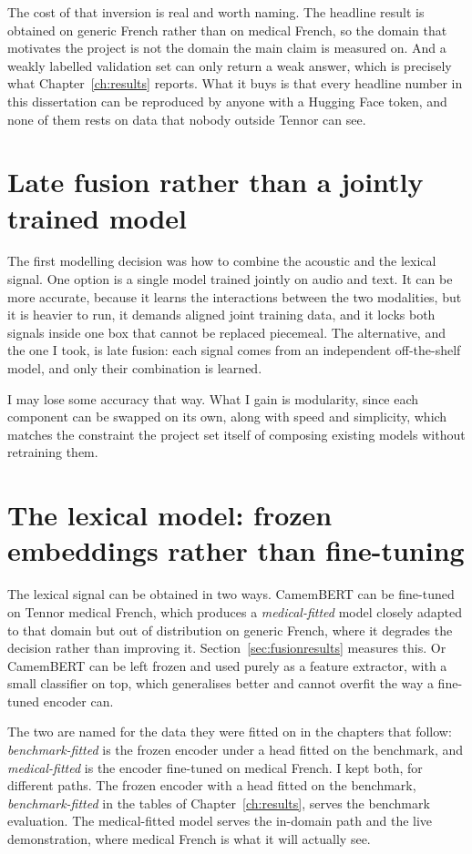 The cost of that inversion is real and worth naming. The headline result is obtained on
generic French rather than on medical French, so the domain that motivates the project is
not the domain the main claim is measured on. And a weakly labelled validation set can only
return a weak answer, which is precisely what Chapter~\ref{ch:results} reports. What it
buys is that every headline number in this dissertation can be reproduced by anyone with a
Hugging Face token, and none of them rests on data that nobody outside Tennor can see.

\section{Late fusion rather than a jointly trained model}
\label{sec:latefusion}

The first modelling decision was how to combine the acoustic and the lexical signal. One
option is a single model trained jointly on audio and text. It can be more accurate,
because it learns the interactions between the two modalities, but it is heavier to run, it
demands aligned joint training data, and it locks both signals inside one box that cannot
be replaced piecemeal. The alternative, and the one I took, is late fusion: each signal
comes from an independent off-the-shelf model, and only their combination is learned.

I may lose some accuracy that way. What I gain is modularity, since each component can be
swapped on its own, along with speed and simplicity, which matches the constraint the
project set itself of composing existing models without retraining them.

\section{The lexical model: frozen embeddings rather than fine-tuning}
\label{sec:frozen}

The lexical signal can be obtained in two ways. CamemBERT can be fine-tuned on Tennor
medical French, which produces a \emph{medical-fitted} model closely adapted to that domain
but out of distribution on generic French, where it degrades the decision rather than
improving it. Section~\ref{sec:fusionresults} measures this. Or CamemBERT can be left frozen and used purely as a
feature extractor, with a small classifier on top, which generalises better and cannot
overfit the way a fine-tuned encoder can.

The two are named for the data they were fitted on in the chapters that follow:
\emph{benchmark-fitted} is the frozen encoder under a head fitted on the benchmark, and
\emph{medical-fitted} is the encoder fine-tuned on medical French. I kept both, for
different paths. The frozen encoder with a head fitted on the benchmark,
\emph{benchmark-fitted} in the tables of Chapter~\ref{ch:results}, serves the benchmark
evaluation. The medical-fitted model serves the in-domain path and the live demonstration,
where medical French is what it will actually see.

